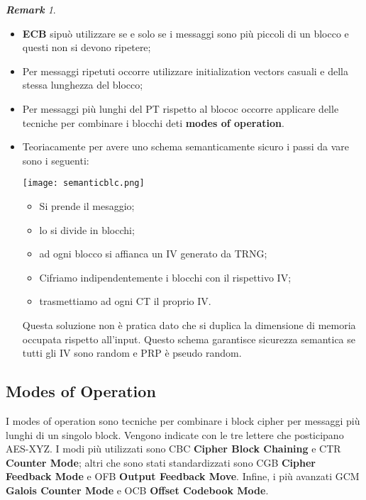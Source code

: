 \documentclass{article}
\theoremstyle{remark}
\newtheorem*{remark}{\textbf{Remark}}
\begin{document}
\begin{remark}
	\begin{itemize}
		\item \textbf{ECB} sipuò utilizzare se e solo se i messaggi sono più piccoli di un blocco e questi non si devono ripetere;
		\item Per messaggi ripetuti occorre utilizzare initialization vectors casuali e della stessa lunghezza del blocco;
		\item Per messaggi più lunghi del PT rispetto al blococ occorre applicare delle tecniche per combinare i blocchi deti \textbf{modes of operation}.
		\item Teoriacamente per avere uno schema semanticamente sicuro i passi da vare sono i seguenti:
		      \begin{center}
			      \texttt{[image: semanticblc.png]}
		      \end{center}
		      \begin{itemize}
			      \item Si prende il mesaggio;
			      \item lo si divide in blocchi;
			      \item ad ogni blocco si affianca un IV generato da TRNG;
			      \item Cifriamo indipendentemente i blocchi con il rispettivo IV;
			      \item trasmettiamo ad ogni CT il proprio IV.
		      \end{itemize}
		      Questa soluzione non è pratica dato che si duplica la dimensione di memoria occupata rispetto all'input. Questo schema garantisce sicurezza semantica se tutti gli IV sono random e PRP è pseudo random.
	\end{itemize}
\end{remark}
\subsection{Modes of Operation}
I modes of operation sono tecniche per combinare i block cipher per messaggi più lunghi di un singolo block. Vengono indicate con le tre lettere che posticipano AES-XYZ.\newline
I modi più utilizzati sono CBC \textbf{Cipher Block Chaining} e CTR \textbf{Counter Mode}; altri che sono stati standardizzati sono CGB \textbf{Cipher Feedback Mode} e OFB \textbf{Output Feedback Move}. Infine, i più avanzati GCM \textbf{Galois Counter Mode} e OCB \textbf{Offset Codebook Mode}.
\end{document}
